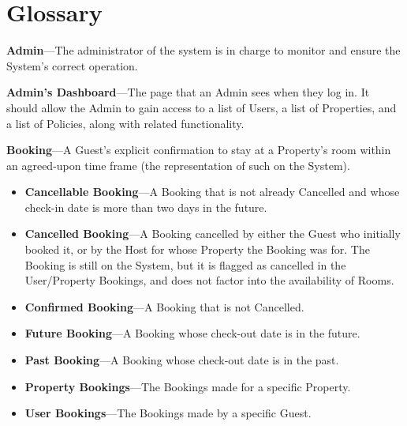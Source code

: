 \chapter{Glossary}
\label{appendix:glossary}

\textbf{Admin}---The administrator of the system is in charge to monitor and ensure the System's correct operation.

\textbf{Admin's Dashboard}---The page that an Admin sees when they log in. It should allow the Admin to gain access to a list of Users, a list of Properties, and a list of Policies, along with related functionality.

\textbf{Booking}---A Guest's explicit confirmation to stay at a Property's room within an agreed-upon time frame (the representation of such on the System).

\begin{itemize}
    \item \textbf{Cancellable Booking}---A Booking that is not already Cancelled and whose check-in date is more than two days in the future.
    \item \textbf{Cancelled Booking}---A Booking cancelled by either the Guest who initially booked it, or by the Host for whose Property the Booking was for. The Booking is still on the System, but it is flagged as cancelled in the User/Property Bookings, and does not factor into the availability of Rooms.
    \item \textbf{Confirmed Booking}---A Booking that is not Cancelled.
    \item \textbf{Future Booking}---A Booking whose check-out date is in the future.
    \item \textbf{Past Booking}---A Booking whose check-out date is in the past.
    \item \textbf{Property Bookings}---The Bookings made for a specific Property.
    \item \textbf{User Bookings}---The Bookings made by a specific Guest.
\end{itemize} 

